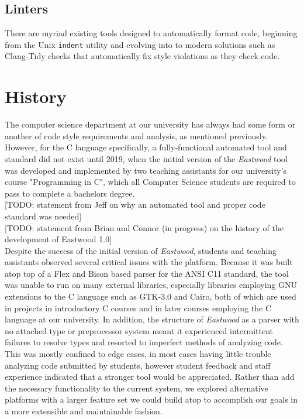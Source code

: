 \documentclass[sigconf]{acmart}
\begin{document}
\subsection{Linters}

There are myriad existing tools designed to automatically format code, beginning from the
Unix \texttt{indent} utility and evolving into to modern solutions such as Clang-Tidy
checks that automatically fix style violations as they check code.
\\

\section{History}

The computer science department at our university has always had some form or another of
code style requirements and analysis, as mentioned previously. However, for the C
language specifically, a fully-functional automated tool and standard did not exist
until 2019, when the initial version of the \textit{Eastwood} tool was developed and
implemented by two teaching assistants for our university's course "Programming in C",
which all Computer Science students are required to pass to complete a bachelors degree.
\\

[TODO: statement from Jeff on why an automated tool and proper code standard was needed]
\\

[TODO: statement from Brian and Connor (in progress) on the history of the development of Eastwood 1.0]
\\

Despite the success of the initial version of \textit{Eastwood}, students and teaching
assistants observed several critical issues with the platform. Because it was built atop
top of a Flex and Bison based parser for the ANSI C11 standard, the tool was unable to
run on many external libraries, especially libraries employing GNU extensions to the C
language such as GTK-3.0 and Cairo, both of which are used in projects in introductory C
courses and in later courses employing the C language at our university. In addition,
the structure of \textit{Eastwood} as a parser with no attached type or preprocessor
system meant it experienced intermittent failures to resolve types and resorted to
imperfect methods of analyzing code. This was mostly confined to edge cases, in most
cases having little trouble analyzing code submitted by students, however student
feedback and staff experience indicated that a stronger tool would be appreciated.
Rather than add the necessary functionality to the current system, we explored
alternative platforms with a larger feature set we could build atop to accomplish our
goals in a more extensible and maintainable fashion.
\\
\end{document}
